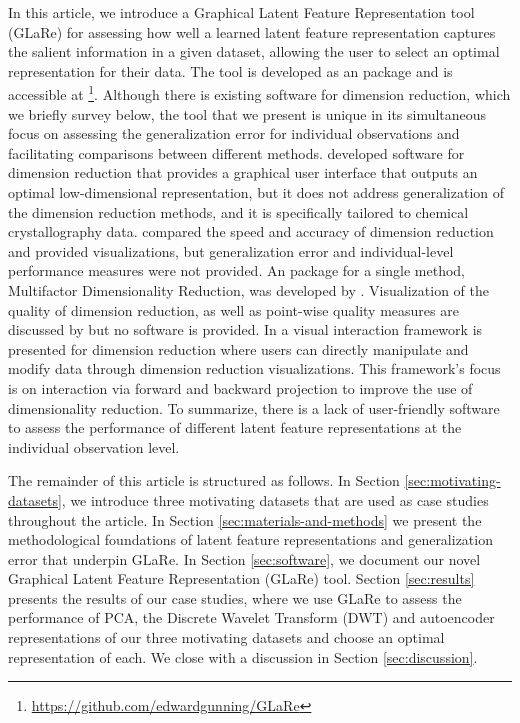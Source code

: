 In this article, we introduce a Graphical Latent Feature Representation tool (GLaRe) for assessing how well a learned latent feature representation captures the salient information in a given dataset, allowing the user to select an optimal representation for their data.
The tool is developed as an  \parencite{r_core_team_r_2022} package and is accessible at \footnote{\url{https://github.com/edwardgunning/GLaRe}}. 
Although there is existing software for dimension reduction, which we briefly survey below, the tool that we present is unique in its simultaneous focus on assessing the generalization error for individual observations and facilitating comparisons between different methods.
\textcite{samudrala_software_2014} developed software for dimension reduction that provides a graphical user interface that outputs an optimal low-dimensional representation, but it does not address generalization of the dimension reduction methods, and it is specifically tailored to chemical crystallography data.
\textcite{zubova_dimensionality_2018} compared the speed and accuracy of dimension reduction and provided visualizations, but generalization error and individual-level performance measures were not provided. 
An  package for a single method, Multifactor Dimensionality Reduction, was developed by \textcite{winham_r_2011}. Visualization of the quality of dimension reduction, as well as point-wise quality measures are discussed by \textcite{mokbel_visualizing_2013} but no software is provided. 
In \textcite{cavallo_visual_2018} a visual interaction framework is presented for dimension reduction where users can directly manipulate and modify data through dimension reduction visualizations. This framework's focus is on interaction via forward and backward projection to improve the use of dimensionality
reduction.
To summarize, there is a lack of user-friendly software to assess the performance of different latent feature representations at the individual observation level.

The remainder of this article is structured as follows.
In Section \ref{sec:motivating-datasets}, we introduce three motivating datasets that are used as case studies throughout the article. 
In Section \ref{sec:materials-and-methods}  we present the methodological foundations of latent feature representations and generalization error that underpin GLaRe. 
In Section \ref{sec:software}, we document our novel Graphical Latent Feature Representation (GLaRe) tool.
Section \ref{sec:results} presents the results of our case studies, where we use GLaRe to assess the performance of PCA, the Discrete Wavelet Transform (DWT) and autoencoder representations of our three motivating datasets and choose an optimal representation of each.
We close with a discussion in Section \ref{sec:discussion}.

